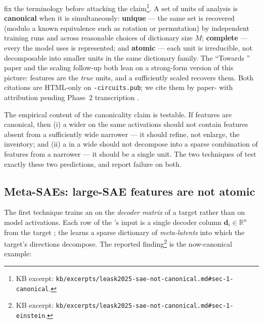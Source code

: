 \citet[\S 1]{leask2025-sae-not-canonical} fix the terminology before
attacking the claim\footnote{KB excerpt:
\nolinkurl{kb/excerpts/leask2025-sae-not-canonical.md#sec-1-canonical}.}.
A set of units of analysis is \textbf{canonical} when it is
simultaneously: \textbf{unique} --- the same set is recovered (modulo
a known equivalence such as rotation or permutation) by independent
training runs and across reasonable choices of dictionary size $M$;
\textbf{complete} --- every  the model uses is represented;
and \textbf{atomic} --- each unit is irreducible, not decomposable into
smaller units in the same dictionary family. The
\citet{bricken2023-monosemanticity} ``Towards '' paper
and the \citet{templeton2024-scaling-monosemanticity} scaling
follow-up both lean on a strong-form version of this picture: 
features are the \emph{true} units, and a sufficiently scaled 
recovers them. Both citations are HTML-only on
\texttt{-circuits.pub}; we cite them by paper- with
attribution pending Phase~2 transcription
.

The empirical content of the canonicality claim is testable. If
features are canonical, then (i) a wider  on the same activations
should not contain features absent from a sufficiently wide narrower
 --- it should refine, not enlarge, the inventory; and (ii) a
 in a wide  should not decompose into a sparse combination
of features from a narrower  --- it should be a single unit. The
two techniques of \citet{leask2025-sae-not-canonical} test exactly
these two predictions, and report failure on both.

\subsection{Meta-SAEs: large-SAE features are not atomic}
\label{sec:meta-saes}

The first technique trains an  on the \emph{decoder matrix} of a
target  rather than on model activations. Each row of the
's input is a single decoder column $\mathbf{d}_i \in
\mathbb{R}^n$ from the target ; the  learns a sparse
dictionary of \emph{meta-latents} into which the target's 
directions decompose. The reported finding\footnote{KB excerpt:
\nolinkurl{kb/excerpts/leask2025-sae-not-canonical.md#sec-1-einstein}.}
is the now-canonical example:

